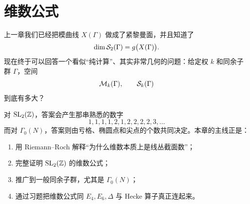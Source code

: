 \chapter{维数公式}
\label{ch:dimension}

上一章我们已经把模曲线 $X(\Gamma)$ 做成了紧黎曼面，并且知道了
\[
  \dim \mathcal{S}_2(\Gamma)=g\bigl(X(\Gamma)\bigr).
\]
现在终于可以回答一个看似“纯计算”、其实非常几何的问题：给定权 $k$ 和同余子群 $\Gamma$，空间
\[
  \mathcal{M}_k(\Gamma),\qquad \mathcal{S}_k(\Gamma)
\]
到底有多大？

对 $\mathrm{SL}_2(\mathbb{Z})$，答案会产生那串熟悉的数字
\[
  1,1,1,1,2,1,2,2,2,2,3,\dots
\]
而对 $\Gamma_0(N)$，答案则由亏格、椭圆点和尖点的个数共同决定。本章的主线正是：
\begin{enumerate}
  \item 用 Riemann--Roch 解释“为什么维数本质上是线丛截面数”；
  \item 完整证明 $\mathrm{SL}_2(\mathbb{Z})$ 的维数公式；
  \item 推广到一般同余子群，尤其是 $\Gamma_0(N)$；
  \item 通过习题把维数公式同 $E_4,E_6,\Delta$ 与 Hecke 算子真正连起来。
\end{enumerate}






